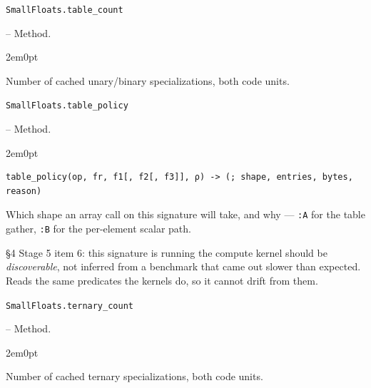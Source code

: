 \par\medskip\noindent\begin{minipage}{\linewidth}
\hypertarget{2349963207154028089}{\texttt{SmallFloats.table\_\allowbreak{}count}}  -- {Method.}
\nopagebreak
\begin{adjustwidth}{2em}{0pt}

Number of cached unary/binary specializations, both code units.



\end{adjustwidth}
\end{minipage}
\par\medskip

\par\medskip\noindent\begin{minipage}{\linewidth}
\hypertarget{9973158012858070886}{\texttt{SmallFloats.table\_\allowbreak{}policy}}  -- {Method.}
\nopagebreak
\begin{adjustwidth}{2em}{0pt}


\begin{verbatim}
table_policy(op, fr, f1[, f2[, f3]], ρ) -> (; shape, entries, bytes, reason)
\end{verbatim}

Which shape an array call on this signature will take, and why — \texttt{:A} for the table gather, \texttt{:B} for the per-element scalar path.

§4 Stage 5 item 6: {\textquotedbl}this signature is running the compute kernel{\textquotedbl} should be \emph{discoverable}, not inferred from a benchmark that came out slower than expected. Reads the same predicates the kernels do, so it cannot drift from them.



\end{adjustwidth}
\end{minipage}
\par\medskip

\par\medskip\noindent\begin{minipage}{\linewidth}
\hypertarget{13413040251500402145}{\texttt{SmallFloats.ternary\_\allowbreak{}count}}  -- {Method.}
\nopagebreak
\begin{adjustwidth}{2em}{0pt}

Number of cached ternary specializations, both code units.



\end{adjustwidth}
\end{minipage}
\par\medskip


